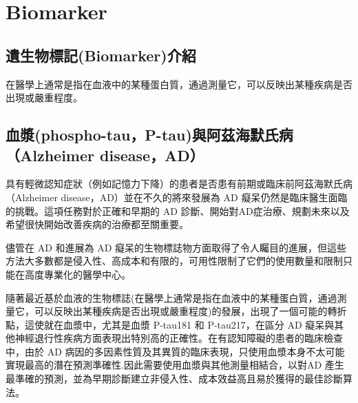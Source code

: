 \chapter{Biomarker}
\label{chapter:intro}
\section{遺生物標記(Biomarker)介紹}
在醫學上通常是指在血液中的某種蛋白質，通過測量它，可以反映出某種疾病是否出現或嚴重程度。


\label{sec:background}
\section{血漿(phospho-tau，P-tau)與阿茲海默氏病（Alzheimer disease，AD）}

具有輕微認知症狀（例如記憶力下降）的患者是否患有前期或臨床前阿茲海默氏病（Alzheimer disease，AD）並在不久的將來發展為 AD 癡呆仍然是臨床醫生面臨的挑戰。這項任務對於正確和早期的 AD 診斷、開始對AD症治療、規劃未來以及希望很快開始改善疾病的治療都至關重要。

儘管在 AD 和進展為 AD 癡呆的生物標誌物方面取得了令人矚目的進展，但這些方法大多數都是侵入性、高成本和有限的，可用性限制了它們的使用數量和限制只能在高度專業化的醫學中心。

隨著最近基於血液的生物標誌(在醫學上通常是指在血液中的某種蛋白質，通過測量它，可以反映出某種疾病是否出現或嚴重程度)的發展，出現了一個可能的轉折點，這使就在血漿中，尤其是血漿 P-tau181 和 P-tau217，在區分 AD 癡呆與其他神經退行性疾病方面表現出特別高的正確性。在有認知障礙的患者的臨床檢查中，由於 AD 病因的多因素性質及其異質的臨床表現，只使用血漿本身不太可能實現最高的潛在預測準確性.因此需要使用血漿與其他測量相結合，以對AD 產生最準確的預測，並為早期診斷建立非侵入性、成本效益高且易於獲得的最佳診斷算法。


